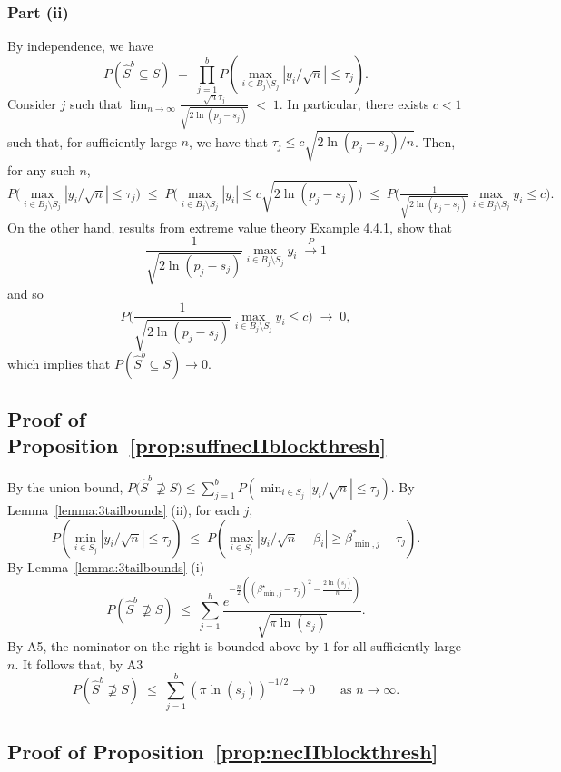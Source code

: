 \documentclass[aos]{imsart}
\theoremstyle{plain}
\begin{document}
\subsubsection{Part (ii)}  By independence, we have 
$$P(\hat{S}^{b} \subseteq S)\;=\;\prod_{j=1}^b P(\max_{i \in B_j\setminus S_j}|y_i/\sqrt{n}| \leq \tau_j).$$ 
Consider $j$ such that $\lim_{n\to \infty} \frac{\sqrt{n}\tau_j}{\sqrt{2\ln(p_j-s_j)}} \;<\;1$. In particular, there exists $c<1$ such that, for sufficiently large $n$, we have that $\tau_j\leq c\sqrt{2\ln(p_j-s_j)/n}$. Then, for any such $n$,
$$
P\Big(\max_{i \in B_j\setminus S_j}|y_i/\sqrt{n}| \leq \tau_j\Big)\;\leq\; P\Big(\max_{i \in B_j\setminus S_j}|y_i| \leq c \sqrt{2\ln(p_j-s_j)}\Big)\;\leq\;P\Big(\tfrac{1}{\sqrt{2\ln(p_j-s_j)}}\max_{i \in B_j\setminus S_j}y_i \leq c \Big).
$$
On the other hand, results from extreme value theory\cite{galambos} Example 4.4.1, show that 
 $$\frac{1}{\sqrt{2 \ln(p_j-s_j)}}\max_{i\in B_j\setminus S_j}y_i \;\overset{P}{\longrightarrow} 1$$
 and so 
 $$
 P\Big(\frac{1}{\sqrt{2\ln(p_j-s_j)}}\max_{i \in B_j\setminus S_j}y_i \leq c \Big)\;\to\;0,
 $$ 
 which implies that $P(\hat{S}^{b} \subseteq S)\to 0$. 

\subsection{Proof of Proposition~\ref{prop:suffnecIIblockthresh}}
	 By the union bound, 
	$P\big(\hat{S}^{b} \not\supseteq S\big)\leq \sum_{j=1}^b  P\left(\min_{i\in S_j}|y_i/\sqrt{n}|\leq\tau_j\right)$. 
	By Lemma~\ref{lemma:3tailbounds} (ii), for each $j$,	
	$$P\left(\min_{i\in S_j}|y_i/\sqrt{n}|\leq\tau_j\right)\;\leq\; P\left(\max_{i\in S_j}|y_i/\sqrt{n}-\beta_i| \geq\beta_{\min,j}^*-\tau_j \right).$$ By Lemma~\ref{lemma:3tailbounds} (i)  
	\begin{equation}\label{eq:type2convrate}
P\left(\hat{S}^{b}\not\supseteq S \right) \;\leq\;\sum_{j=1}^b\frac{e^{-\tfrac{n}{2}\left((\beta^\star_{\min,j}-\tau_j)^2-\tfrac{2\ln(s_j)}{n}\right)}}{\sqrt{\pi\ln(s_j)}}.		
	\end{equation}
 By A5, the nominator on the right is bounded above by $1$ for all sufficiently large $n$. It follows that, by A3 
	$$P\left(\hat{S}^{b} \not\supseteq S \right) \;\leq\;  \sum_{j=1}^b (\pi\ln (s_j))^{-1/2} \to 0\qquad \mbox{as } n\to \infty.$$ 

\subsection{Proof of Proposition~\ref{prop:necIIblockthresh}} 
\end{document}
